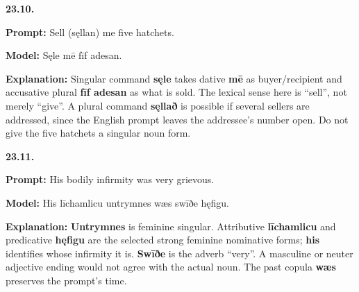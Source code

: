 \par\begin{minipage}{\linewidth}\raggedright
\textbf{23.10.}

\textbf{Prompt:} Sell (sęllan) me five hatchets.

\textbf{Model:} Sęle mē fīf adesan.

\textbf{Explanation:} Singular command \textbf{sęle} takes dative \textbf{mē} as buyer/\allowbreak{}recipient and accusative plural \textbf{fīf adesan} as what is sold. The lexical sense here is “sell”, not merely “give”. A plural command \textbf{sęllað} is possible if several sellers are addressed, since the English prompt leaves the addressee’s number open. Do not give the five hatchets a singular noun form.

\end{minipage}\par\addvspace{4pt}

\par\begin{minipage}{\linewidth}\raggedright
\textbf{23.11.}

\textbf{Prompt:} His bodily infirmity was very grievous.

\textbf{Model:} His līchamlicu untrymnes wæs swīðe hęfigu.

\textbf{Explanation:} \textbf{Untrymnes} is feminine singular. Attributive \textbf{līchamlicu} and predicative \textbf{hęfigu} are the selected strong feminine nominative forms; \textbf{his} identifies whose infirmity it is. \textbf{Swīðe} is the adverb “very”. A masculine or neuter adjective ending would not agree with the actual noun. The past copula \textbf{wæs} preserves the prompt’s time.

\end{minipage}\par\addvspace{4pt}

